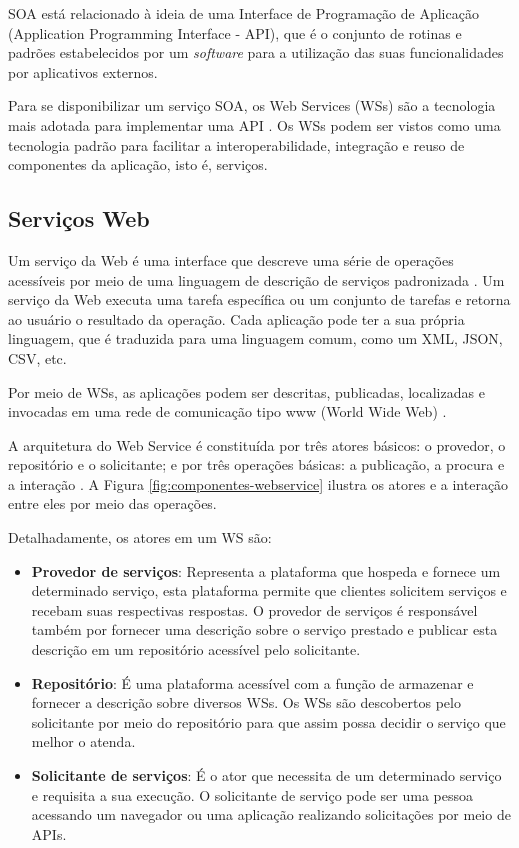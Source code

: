 	SOA está relacionado à ideia de uma Interface de Programação de Aplicação (Application Programming Interface - API), que é o conjunto de rotinas e padrões estabelecidos por um \textit{software} para a utilização das suas funcionalidades por aplicativos externos.
	
	Para se disponibilizar um serviço SOA, os Web Services (WSs) são a tecnologia mais adotada para
	implementar uma API \cite{souit2013soa}. Os WSs podem ser vistos como uma tecnologia padrão para facilitar a interoperabilidade, integração e reuso de componentes da aplicação, isto é, serviços.
	
	\subsection{Serviços Web}
	
	Um serviço da Web é uma interface que descreve uma série de operações acessíveis por meio de uma linguagem de descrição de serviços padronizada \cite{gottschalk2002webservices}. Um serviço da Web executa uma tarefa específica ou um conjunto de tarefas e retorna ao usuário o resultado da operação. Cada aplicação pode ter a sua própria linguagem, que é traduzida para uma linguagem comum, como um XML, JSON, CSV, etc.
	
	Por meio de WSs, as aplicações podem ser descritas, publicadas, localizadas e invocadas em uma rede de comunicação tipo www (World Wide Web) \cite{souit2013soa}.
	
	A arquitetura do Web Service é constituída por três atores básicos: o provedor, o repositório e o solicitante; e por três operações básicas: a publicação, a procura e a interação \cite{gottschalk2002webservices}. A Figura \ref{fig:componentes-webservice} ilustra os atores e a interação entre eles por meio das operações.
	
	Detalhadamente, os atores em um WS são:
	
	\begin{itemize}
		\item \textbf{Provedor de serviços}: Representa a plataforma que hospeda e fornece um determinado serviço, esta plataforma permite que clientes solicitem serviços e recebam suas respectivas respostas. O provedor de serviços é responsável também por fornecer uma descrição sobre o serviço prestado e publicar esta descrição em um repositório acessível pelo solicitante.
		
		\item \textbf{Repositório}: É uma plataforma acessível com a função de armazenar e fornecer a descrição sobre diversos WSs. Os WSs são descobertos pelo solicitante por meio do repositório para que assim possa decidir o serviço que melhor o atenda.
		
		\item \textbf{Solicitante de serviços}: É o ator que necessita de um determinado serviço e requisita a sua execução. O solicitante de serviço pode ser uma pessoa acessando um navegador ou uma aplicação realizando solicitações por meio de APIs. 
		
		
	\end{itemize}

